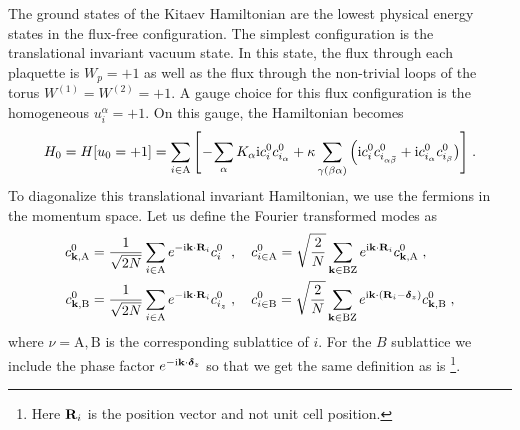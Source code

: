 The ground states of the Kitaev Hamiltonian are the lowest physical energy states in the flux-free configuration. The simplest configuration is the translational invariant vacuum state.
In this state, the flux through each plaquette is $W_p=+1$ as well as the flux through the non-trivial loops of the torus $W^{(1)}=W^{(2)}=+1$.
A gauge choice for this flux configuration is the homogeneous $u_i^\alpha=+1$. On this gauge, the Hamiltonian becomes
\begin{equation}
    H_0 = H[u_0=+1] =
    \sum_{i\in\mathrm A} \Bigg[ \!
    -\!\sum_{\alpha} K_{\alpha}  \im c_i^0 c_{i_\alpha}^0
    + \kappa \sum_{\gamma(\beta \alpha )} \Big(
    \im  c_i^0  c_{i_{\alpha\bar{\beta}}}^0  +
    \im c_{i_\alpha}^0 c_{i_{ {\beta}}}^0 \big)   \Bigg] \; .
\end{equation}
To diagonalize this translational invariant Hamiltonian, we use the fermions in the momentum space.
Let us define the Fourier transformed modes as
\begin{equation}
    \begin{split}
         c_{\mathbf{k},\mathrm{A} }^0 &= \frac{1}{\sqrt{2N}}\sum_{i\in \mathrm{A} } e^{-\mathrm{i} \mathbf{k}\cdot \mathbf{R}_i} c_{i_{\phantom{z}}}^0 \; , \quad
    c_{i \in \mathrm{A} }^0 = \sqrt{\frac{2}{N}} \sum_{\mathbf{k}\in{\text{BZ}}} e^{\mathrm{i} \mathbf{k}\cdot \mathbf{R}_i} c_{\mathbf{k},\mathrm{A}}^0 \; ,
    \\
    c_{\mathbf{k},\mathrm{B} }^0 &= \frac{1}{\sqrt{2N}}\sum_{i\in \mathrm{A} } e^{-\mathrm{i} \mathbf{k}\cdot \mathbf{R}_i} c_{i_z}^0 \; , \quad
    c_{i \in \mathrm{B} }^0 = \sqrt{\frac{2}{N}} \sum_{\mathbf{k}\in{\text{BZ}}} e^{\mathrm{i} \mathbf{k}\cdot (\mathbf{R}_{i}-\bm{\delta}_z ) }   c_{\mathbf{k},\mathrm{B}}^0 \; ,
     \label{eq:FT}
    \end{split}
\end{equation}
where $\nu=\mathrm{A}, \mathrm{B}$ is the corresponding sublattice of $i$.
For the $B$ sublattice we include the phase factor $e^{-\mathrm{i} \mathbf{k}\cdot\bm{\delta}_z}$ so that we get the same definition as is \cite{Kitaev2006}\footnote{Here $\mathbf{R}_i$ is the position vector and not unit cell position.}.

